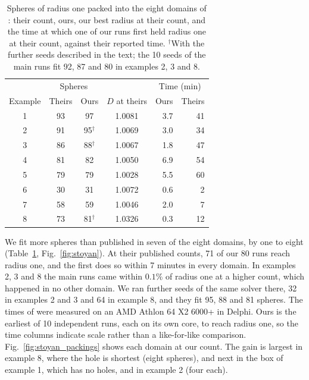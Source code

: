 \documentclass[preprint,12pt]{elsarticle}
\theoremstyle{remark}
\begin{document}
\begin{table}[htbp]
  \caption{Spheres of radius one packed into the eight domains of
    \citet{stoyan2013}: their count, ours, our best radius at their count,
    and the time at which one of our runs first held radius one at their
    count, against their reported time. $^\dagger$With the further
    seeds described in the
  text; the 10 seeds of the main runs fit 92, 87 and 80 in examples 2, 3 and 8.}
  \label{tab:stoyan}
  \centering
  \small
  \setlength{\tabcolsep}{4pt}
  \begin{tabular}{ccccrr}
    \hline
    & \multicolumn{2}{c}{Spheres} & & \multicolumn{2}{c}{Time (min)} \\
    Example & Theirs & Ours & $D$ at theirs & Ours & Theirs \\
    \hline
    1 & 93 & 97 & 1.0081 & 3.7 & 41 \\
    2 & 91 & 95$^\dagger$ & 1.0069 & 3.0 & 34 \\
    3 & 86 & 88$^\dagger$ & 1.0067 & 1.8 & 47 \\
    4 & 81 & 82 & 1.0050 & 6.9 & 54 \\
    5 & 79 & 79 & 1.0028 & 5.5 & 60 \\
    6 & 30 & 31 & 1.0072 & 0.6 & 2 \\
    7 & 58 & 59 & 1.0046 & 2.0 & 7 \\
    8 & 73 & 81$^\dagger$ & 1.0326 & 0.3 & 12 \\
    \hline
  \end{tabular}
\end{table}

We fit more spheres than published in seven of the eight domains, by one to
eight (Table~\ref{tab:stoyan}, Fig.~\ref{fig:stoyan}). At their published
counts, 71 of our 80 runs reach radius one, and the first does so within 7
minutes in every domain. In examples 2, 3 and 8 the main runs came within
$0.1\%$ of radius one at a higher count, which happened in no other domain. We
ran further seeds of the same solver there, 32 in examples 2 and 3 and 64 in
example 8, and they fit 95, 88 and 81 spheres. The times of \citet{stoyan2013}
were measured on an AMD Athlon 64 X2 6000+ in Delphi. Ours is the earliest of 10
independent runs, each on its own core, to reach radius one, so the time columns
indicate scale rather than a like-for-like comparison.
Fig.~\ref{fig:stoyan_packings} shows each domain at our count. The gain is
largest in example 8, where the hole is shortest (eight spheres), and next in
the box of example 1, which has no holes, and in example 2 (four each).
\end{document}
